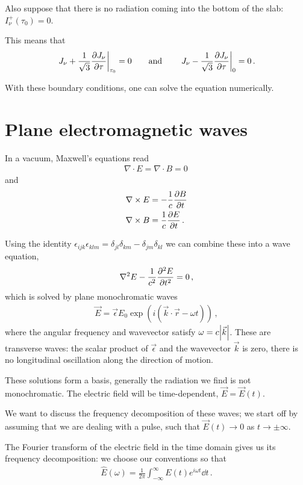 \documentclass[main.tex]{subfiles}
\begin{document}
Also suppose that there is no radiation coming into the bottom of the slab: \(I_\nu^{+} (\tau_0 ) = 0\). 

This means that 
%
\begin{align}
\eval{J_\nu + \frac{1}{\sqrt{3}} \pdv{J_\nu }{\tau }}_{\tau_0 } = 0
\qquad \text{and} \qquad
\eval{J_\nu - \frac{1}{\sqrt{3}} \pdv{J_\nu }{\tau }}_{0} = 0
\,. 
\end{align}

With these boundary conditions, one can solve the equation numerically.

\section{Plane electromagnetic waves}

In a vacuum, Maxwell's equations read 
%
\begin{align}
\nabla \cdot E = \nabla \cdot B =0
\,
\end{align}
%
and 
%
\begin{align}
\nabla \times E &= - \frac{1}{c} \pdv{B}{t}  \\
\nabla \times B &= \frac{1}{c} \pdv{E}{t}
\,.
\end{align}

Using the identity \(\epsilon_{ijk} \epsilon_{klm} = \delta_{jl} \delta_{km} - \delta_{jm} \delta_{kl}\) we can combine these into a wave equation, 
%
\begin{align}
\nabla^2 E - \frac{1}{c^2} \pdv[2]{E}{t} = 0 
\,,
\end{align}
%
which is solved by plane monochromatic waves 
%
\begin{align}
\vec{E}  =\vec{\epsilon} E_0 \exp(i (\vec{k} \cdot \vec{r} - \omega t))
\,,
\end{align}
%
where the angular frequency and wavevector satisfy \(\omega = c \abs{\vec{k}}\).
These are transverse waves: the scalar product of \(\vec{\epsilon}\) and the wavevector \(\vec{k}\) is zero, there is no longitudinal oscillation along the direction of motion. 

These solutions form a basis, generally the radiation we find is not monochromatic. 
The electric field will be time-dependent, \(\vec{E} = \vec{E} (t)\). 

We want to discuss the frequency decomposition of these waves; we start off by assuming that we are dealing with a pulse, such that \(\vec{E}(t) \rightarrow 0\) as \(t \to \pm \infty \).

The Fourier transform of the electric field in the time domain gives us its frequency decomposition: we choose our conventions so that 
%
\begin{align}
\hat{E}(\omega ) = \frac{1}{2 \pi } \int_{- \infty }^{\infty } E(t) e^{i \omega t} \dd{t} 
\,.
\end{align}
\end{document}
